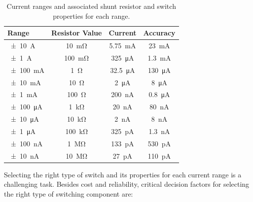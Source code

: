 \begin{table}[h!]
    \centering
    \begin{tabular}{|l|c|c|c|}
        \hline
        \textbf{Range}             & \textbf{Resistor Value} & \textbf{Current}         & \textbf{Accuracy}       \\ \hline
        \SI{\pm10}{\ampere}        & \SI{10}{\milli\ohm}     & \SI{5.75}{\milli\ampere} & \SI{23}{\milli\ampere}  \\ \hline
        \SI{\pm1}{\ampere}         & \SI{100}{\milli\ohm}    & \SI{325}{\micro\ampere}  & \SI{1.3}{\milli\ampere} \\ \hline
        \SI{\pm100}{\milli\ampere} & \SI{1}{\ohm}            & \SI{32.5}{\micro\ampere} & \SI{130}{\micro\ampere} \\ \hline
        \SI{\pm10}{\milli\ampere}  & \SI{10}{\ohm}           & \SI{2}{\micro\ampere}    & \SI{8}{\micro\ampere}   \\ \hline
        \SI{\pm1}{\milli\ampere}   & \SI{100}{\ohm}          & \SI{200}{\nano\ampere}   & \SI{0.8}{\micro\ampere} \\ \hline
        \SI{\pm100}{\micro\ampere} & \SI{1}{\kilo\ohm}       & \SI{20}{\nano\ampere}    & \SI{80}{\nano\ampere}   \\ \hline
        \SI{\pm10}{\micro\ampere}  & \SI{10}{\kilo\ohm}      & \SI{2}{\nano\ampere}     & \SI{8}{\nano\ampere}    \\ \hline
        \SI{\pm1}{\micro\ampere}   & \SI{100}{\kilo\ohm}     & \SI{325}{\pico\ampere}   & \SI{1.3}{\nano\ampere}  \\ \hline
        \SI{\pm100}{\nano\ampere}  & \SI{1}{\mega\ohm}       & \SI{133}{\pico\ampere}   & \SI{530}{\pico\ampere}  \\ \hline
        \SI{\pm10}{\nano\ampere}   & \SI{10}{\mega\ohm}      & \SI{27}{\pico\ampere}    & \SI{110}{\pico\ampere}  \\ \hline
    \end{tabular}
    \caption[Current Sense Shunt Resistors]{
        Current ranges and associated shunt resistor and switch properties for
        each range.
    }
    \label{table:current_sense_resistors}
\end{table}

Selecting the
right type of switch and its properties for each current range is a challenging
task.
Besides cost and reliability, critical decision factors for selecting the
right type of switching component are:

